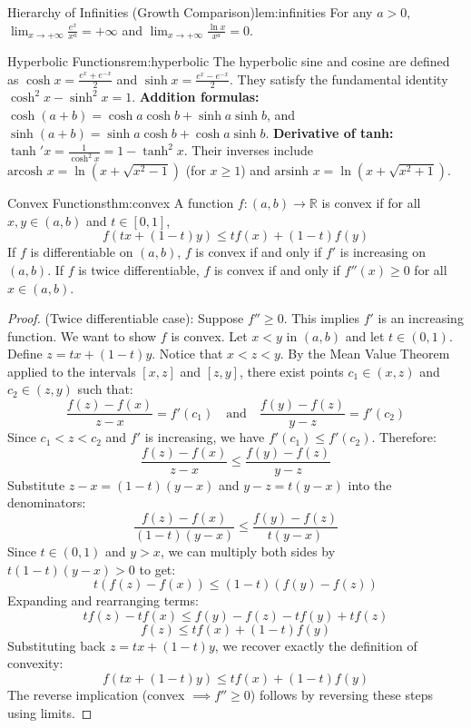 \documentclass[11pt, a4paper]{article}
\begin{document}
\begin{lemma}{Hierarchy of Infinities (Growth Comparison)}{lem:infinities}
For any $a > 0$, $\lim_{x \to +\infty} \frac{e^x}{x^a} = +\infty$ and $\lim_{x \to +\infty} \frac{\ln x}{x^a} = 0$.
\end{lemma}

\begin{remark}{Hyperbolic Functions}{rem:hyperbolic}
The hyperbolic sine and cosine are defined as $\cosh x = \frac{e^x + e^{-x}}{2}$ and $\sinh x = \frac{e^x - e^{-x}}{2}$. 
They satisfy the fundamental identity $\cosh^2 x - \sinh^2 x = 1$. 
\textbf{Addition formulas:} $\cosh(a+b) = \cosh a \cosh b + \sinh a \sinh b$, and $\sinh(a+b) = \sinh a \cosh b + \cosh a \sinh b$.
\textbf{Derivative of tanh:} $\tanh' x = \frac{1}{\cosh^2 x} = 1 - \tanh^2 x$.
Their inverses include $\text{arcosh } x = \ln(x + \sqrt{x^2 - 1})$ (for $x \ge 1$) and $\text{arsinh } x = \ln(x + \sqrt{x^2 + 1})$.
\end{remark}

\begin{theorem}{Convex Functions}{thm:convex}
A function $f: (a,b) \to \mathbb{R}$ is convex if for all $x, y \in (a,b)$ and $t \in [0,1]$, 
$$ f(tx + (1-t)y) \le tf(x) + (1-t)f(y) $$
If $f$ is differentiable on $(a,b)$, $f$ is convex if and only if $f'$ is increasing on $(a,b)$. 
If $f$ is twice differentiable, $f$ is convex if and only if $f''(x) \ge 0$ for all $x \in (a,b)$.
\end{theorem}
\begin{proof}
(Twice differentiable case): Suppose $f'' \ge 0$. This implies $f'$ is an increasing function. We want to show $f$ is convex.
Let $x < y$ in $(a,b)$ and let $t \in (0,1)$. Define $z = tx + (1-t)y$. Notice that $x < z < y$.
By the Mean Value Theorem applied to the intervals $[x, z]$ and $[z, y]$, there exist points $c_1 \in (x, z)$ and $c_2 \in (z, y)$ such that:
$$ \frac{f(z) - f(x)}{z - x} = f'(c_1) \quad \text{and} \quad \frac{f(y) - f(z)}{y - z} = f'(c_2) $$
Since $c_1 < z < c_2$ and $f'$ is increasing, we have $f'(c_1) \le f'(c_2)$. Therefore:
$$ \frac{f(z) - f(x)}{z - x} \le \frac{f(y) - f(z)}{y - z} $$
Substitute $z - x = (1-t)(y - x)$ and $y - z = t(y - x)$ into the denominators:
$$ \frac{f(z) - f(x)}{(1-t)(y-x)} \le \frac{f(y) - f(z)}{t(y-x)} $$
Since $t \in (0,1)$ and $y > x$, we can multiply both sides by $t(1-t)(y-x) > 0$ to get:
$$ t(f(z) - f(x)) \le (1-t)(f(y) - f(z)) $$
Expanding and rearranging terms:
$$ tf(z) - tf(x) \le f(y) - f(z) - tf(y) + tf(z) $$
$$ f(z) \le tf(x) + (1-t)f(y) $$
Substituting back $z = tx + (1-t)y$, we recover exactly the definition of convexity:
$$ f(tx + (1-t)y) \le tf(x) + (1-t)f(y) $$
The reverse implication (convex $\implies f'' \ge 0$) follows by reversing these steps using limits.
\end{proof}
\end{document}

